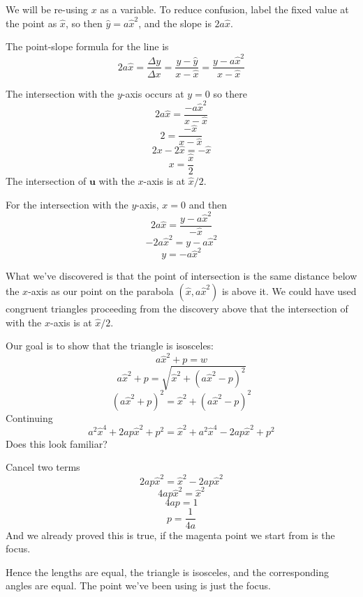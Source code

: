 \documentclass[11pt, oneside]{article}
\begin{document}
We will be re-using $x$ as a variable.  To reduce confusion, label the fixed value at the point as $\hat{x}$, so then $\hat{y} = a\hat{x}^2$, and the slope is $2a \hat{x}$.

The point-slope formula for the line is 
\[ 2a \hat{x} = \frac{\Delta y}{\Delta x} = \frac{y - \hat{y}}{x - \hat{x}} =  \frac{y - a \hat{x}^2}{x - \hat{x}} \]

The intersection with the $y$-axis occurs at $y = 0$ so there
\[ 2a \hat{x} = \frac{- a \hat{x}^2}{x - \hat{x}} \]
\[ 2 = \frac{- \hat{x}}{x - \hat{x}} \]
\[ 2x - 2 \hat{x} = - \hat{x} \]
\[ x = \frac{\hat{x}}{2} \]
The intersection of $\mathbf{u}$ with the $x$-axis is at $\hat{x}/2$.

For the intersection with the $y$-axis, $x = 0$ and then
\[ 2a \hat{x} = \frac{y - a \hat{x}^2}{- \hat{x}} \]
\[ -2a \hat{x}^2 = y - a \hat{x}^2 \]
\[ y = - a \hat{x}^2 \]

What we've discovered is that the point of intersection is the same distance below the $x$-axis as our point on the parabola $(\hat{x}, a\hat{x}^2)$ is above it.  We could have used congruent triangles proceeding from the discovery above that the intersection of with the $x$-axis is at $\hat{x}/2$.

Our goal is to show that the triangle is isosceles:
\[ a\hat{x}^2 + p = w \]
\[ a\hat{x}^2 + p = \sqrt{\hat{x}^2 + (a\hat{x}^2 - p)^2} \]
\[ (a\hat{x}^2 + p)^2 = \hat{x}^2 + (a\hat{x}^2 - p)^2 \]
Continuing
\[ a^2 \hat{x}^4 + 2ap \hat{x}^2 + p^2 = \hat{x}^2 + a^2 \hat{x}^4 - 2ap \hat{x}^2 + p^2 \]
Does this look familiar?

Cancel two terms
\[ 2ap \hat{x}^2 = \hat{x}^2  - 2ap \hat{x}^2 \]
\[ 4ap\hat{x}^2 = \hat{x}^2 \]
\[ 4ap = 1 \]
\[ p = \frac{1}{4a} \]
And we already proved this is true, if the magenta point we start from is the focus.

Hence the lengths are equal, the triangle is isosceles, and the corresponding angles are equal.  The point we've been using is just the focus.
\end{document}
